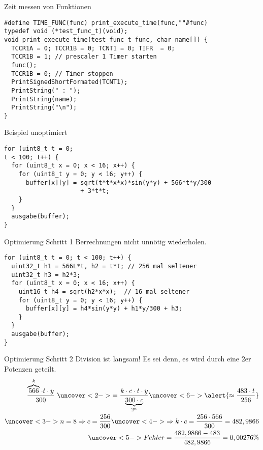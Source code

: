 \documentclass{beamer}
\begin{document}
\begin{frame}[fragile]{Zeit messen von Funktionen}
\begin{verbatim}
#define TIME_FUNC(func) print_execute_time(func,""#func) 
typedef void (*test_func_t)(void);
void print_execute_time(test_func_t func, char name[]) {
  TCCR1A = 0; TCCR1B = 0; TCNT1 = 0; TIFR  = 0; 
  TCCR1B = 1; // prescaler 1 Timer starten
  func();
  TCCR1B = 0; // Timer stoppen
  PrintSignedShortFormated(TCNT1);
  PrintString(" : ");
  PrintString(name);	
  PrintString("\n");
}
\end{verbatim}
\end{frame}

\begin{frame}[fragile]{Beispiel unoptimiert}
\begin{verbatim}
for (uint8_t t = 0; 
t < 100; t++) {
  for (uint8_t x = 0; x < 16; x++) {
    for (uint8_t y = 0; y < 16; y++) {
      buffer[x][y] = sqrt(t*t*x*x)*sin(y*y) + 566*t*y/300 
                     + 3*t*t;
    }
  }
  ausgabe(buffer);
}
\end{verbatim}
\end{frame}

\begin{frame}[fragile]{Optimierung Schritt 1}
Berrechnungen nicht unnötig wiederholen.
\begin{verbatim}
for (uint8_t t = 0; t < 100; t++) {
  uint32_t h1 = 566L*t, h2 = t*t; // 256 mal seltener
  uint32_t h3 = h2*3; 
  for (uint8_t x = 0; x < 16; x++) {
    uint16_t h4 = sqrt(h2*x*x);  // 16 mal seltener
    for (uint8_t y = 0; y < 16; y++) {
      buffer[x][y] = h4*sin(y*y) + h1*y/300 + h3;
    }
  }
  ausgabe(buffer);
}
\end{verbatim}
\end{frame}

\begin{frame}[fragile]{Optimierung Schritt 2}
Division ist langsam! \newline
Es sei denn, es wird durch eine 2er Potenzen geteilt.
\begin{eqnarray*}
\frac{\overbrace{566}^k \cdot t \cdot y}{300} \ 
\uncover<2->{= \frac{k \cdot c \cdot t \cdot y}{\underbrace{300 \cdot c}_{2^n}}} 
\uncover<6->{\alert{\approx \frac{483 \cdot t}{256}}} \\
\uncover<3->{n = 8 \Rightarrow c = \frac{256}{300}} 
\uncover<4->{\Rightarrow k \cdot c = \frac{256 \cdot 566}{300} = 482,9866} \\
\uncover<5->{Fehler = \frac{482,9866 - 483}{482,9866} = 0,00276 \%} 
\end{eqnarray*}
\end{frame}
\end{document}
